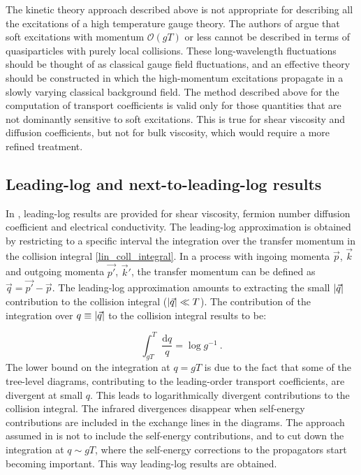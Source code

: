 The kinetic theory approach described above is not appropriate for describing all the excitations of a high temperature gauge theory. The authors of \cite{Arnold:2000dr,Arnold:2003zc} argue that soft excitations with momentum $\mathcal O(gT)$ or less cannot be described in terms of quasiparticles with purely local collisions. These long-wavelength fluctuations should be thought of as classical gauge field fluctuations, and an effective theory should be constructed in which the high-momentum excitations propagate in a slowly varying classical background field. The method described above for the computation of transport coefficients is valid only for those quantities that are not dominantly sensitive to soft excitations. This is true for shear viscosity and diffusion coefficients, but not for bulk viscosity, which would require a more refined treatment.

 
\subsection{Leading-log and next-to-leading-log results}

In \cite{Arnold:2000dr}, leading-log results are provided for shear viscosity, fermion number diffusion coefficient and electrical conductivity. The leading-log approximation is obtained by restricting to a specific interval the integration over the transfer momentum in the collision integral \ref{lin_coll_integral}. In a process with ingoing momenta $\vec p$, $\vec k$ and outgoing momenta $\vec{p'}$, $\vec k'$, the transfer momentum can be defined as $\vec q = \vec{p'} - \vec p$. The leading-log approximation amounts to extracting the small $\abs{\vec q}$ contribution to the collision integral ($\abs{\vec q} \ll T$). The contribution of the integration over $q \equiv \abs{\vec q}$ to the collision integral results to be:

\begin{equation}
\int_{gT}^T \frac{\mathrm d q}{q} = \log g^{-1} \: .
\end{equation}
%
The lower bound on the integration at $q = gT$ is due to the fact that some of the tree-level diagrams, contributing to the leading-order transport coefficients, are divergent at small $q$. This leads to logarithmically divergent contributions to the collision integral. The infrared divergences disappear when self-energy contributions are included in the exchange lines in the diagrams. The approach assumed in \cite{Arnold:2000dr} is not to include the self-energy contributions, and to cut down the integration at $q \sim gT$, where the self-energy corrections to the propagators start becoming important. This way leading-log results are obtained.

